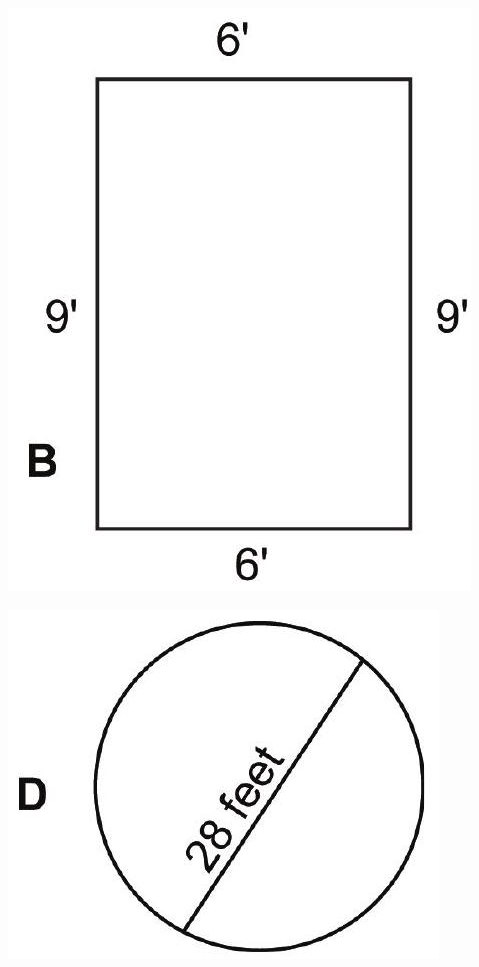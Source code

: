 \documentclass[10pt]{article}
\begin{document}
\includegraphics[max width=\textwidth]{2022_09_11_72dbedc910e6e984560cg-26(1)}

\includegraphics[max width=\textwidth]{2022_09_11_72dbedc910e6e984560cg-26(2)}
\end{document}

